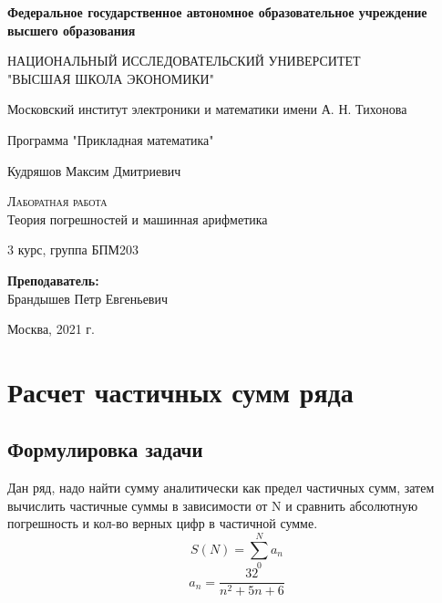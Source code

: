 \documentclass[a4paper,12pt]{article}
\begin{document}
\begin{titlepage}
  \begin{center}
    \large
     
    \textbf{Федеральное государственное автономное образовательное учреждение высшего образования}
    \vspace{0.5cm}
 
    НАЦИОНАЛЬНЫЙ ИССЛЕДОВАТЕЛЬСКИЙ УНИВЕРСИТЕТ \\ "ВЫСШАЯ ШКОЛА ЭКОНОМИКИ"
    \vspace{0.5cm}
     
    Московский институт электроники и математики имени А. Н. Тихонова 
     
    Программа "Прикладная математика"
    \vfill
     
     
    Кудряшов Максим Дмитриевич
    \vfill
 
    \textsc{Лаборатная работа}\\[5mm]
     
    {\LARGE Теория погрешностей и машинная арифметика\\[2mm]
    }
  \bigskip
     
    3 курс, группа БПМ203
\end{center}
\vfill
 

 
\hfill\begin{flushright}
  \textbf{Преподаватель:}\\
  Брандышев Петр Евгеньевич
\end{flushright}%
\vfill
 
\begin{center}
  Москва, 2021 г.
\end{center}
\end{titlepage}


\tableofcontents

\section{Расчет частичных сумм ряда}
\subsection{Формулировка задачи}
Дан ряд, надо найти сумму аналитически как предел частичных сумм, затем вычислить частичные суммы в зависимости от N и сравнить абсолютную погрешность и кол-во верных цифр в частичной сумме.
   $$S(N) = \sum_0^N a_n$$
   $$a_n = \frac{32}{n^2 +5n + 6}$$
   
\end{document}
